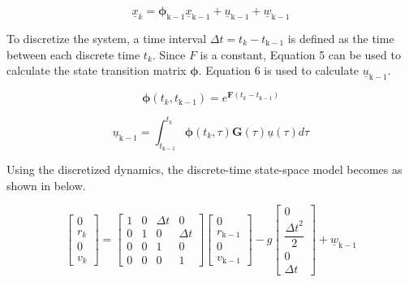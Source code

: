 \documentclass{article}
\begin{document}
\begin{equation}
    \underline{x}_k = \boldsymbol{\phi}_\mathrm{k-1}\underline{x}_\mathrm{k-1} + \underline{u}_\mathrm{k-1} + \underline{w}_\mathrm{k-1}
\end{equation}

To discretize the system, a time interval $\Delta t = t_k - t_\mathrm{k-1}$ is defined as the time between each discrete time $t_k$. Since $F$ is a constant, Equation 5 can be used to calculate the state transition matrix $\boldsymbol{\phi}$. Equation 6 is used to calculate $\underline{u}_\mathrm{k-1}$.

\begin{equation}
    \boldsymbol{\phi}(t_k,t_\mathrm{k-1}) = e^{\mathbf{F}(t_k - t_\mathrm{k-1})}
\end{equation}

\begin{equation}
    \underline{u}_\mathrm{k-1} = \int_{t_\mathrm{k-1}}^{t_k} \boldsymbol{\phi}(t_k, \tau)\mathbf{G}(\tau)\underline{u}(\tau)d\tau
\end{equation}

Using the discretized dynamics, the discrete-time state-space model becomes as shown in below. 

\begin{equation*}
    \begin{bmatrix} 0 \\ r_k \\ 0 \\ v_k \end{bmatrix} = 
    \begin{bmatrix}
        1 & 0 & \Delta t & 0\\
        0 & 1 & 0 & \Delta t \\
        0 & 0 & 1 & 0 \\
        0 & 0 & 0 & 1
    \end{bmatrix}
    \begin{bmatrix} 0\\r_\mathrm{k-1}\\0\\v_\mathrm{k-1} \end{bmatrix} - g
    \begin{bmatrix}
        0 \\
        \dfrac{{\Delta t}^2}{2} \\
        0 \\
        \Delta t
    \end{bmatrix}
    +
    \underline{w}_\mathrm{k-1}
\end{equation*}
\end{document}

